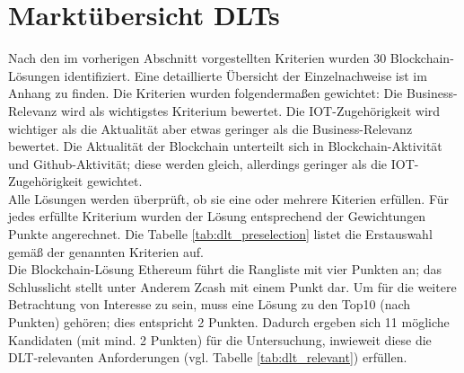 %
%
\section{Marktübersicht DLTs}
\label{sec:dlt_selection:market}
Nach den im vorherigen Abschnitt vorgestellten Kriterien wurden 30 Blockchain-Lösungen identifiziert. Eine detaillierte Übersicht der Einzelnachweise ist im Anhang zu finden. Die Kriterien wurden folgendermaßen gewichtet: Die Business-Relevanz wird als wichtigstes Kriterium bewertet. Die IOT-Zugehörigkeit wird wichtiger als die Aktualität aber etwas geringer als die Business-Relevanz bewertet. Die Aktualität der Blockchain unterteilt sich in Blockchain-Aktivität und Github-Aktivität; diese werden gleich, allerdings geringer als die IOT-Zugehörigkeit gewichtet.\\
Alle Lösungen werden überprüft, ob sie eine oder mehrere Kiterien erfüllen. Für jedes erfüllte Kriterium wurden der Lösung entsprechend der Gewichtungen Punkte angerechnet. Die Tabelle \ref{tab:dlt_preselection} listet die Erstauswahl gemäß der genannten Kriterien auf.\\
Die Blockchain-Lösung Ethereum führt die Rangliste mit vier Punkten an; das Schlusslicht stellt unter Anderem Zcash mit einem Punkt dar. Um für die weitere Betrachtung von Interesse zu sein, muss eine Lösung zu den Top10 (nach Punkten) gehören; dies entspricht 2 Punkten. Dadurch ergeben sich 11 mögliche Kandidaten (mit mind. 2 Punkten) für die Untersuchung, inwieweit diese die \ac{DLT}-relevanten Anforderungen (vgl. Tabelle \ref{tab:dlt_relevant}) erfüllen.

